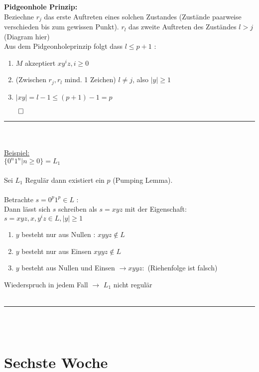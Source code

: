 \documentclass[18pt,a4paper]{scrreprt}
\begin{document}
\textbf{Pidgeonhole Prinzip:}\\
Beziechne $r_j$ das erste Auftreten eines solchen Zustandes (Zustände paarweise verschieden bis zum gewissen Punkt). $r_l$ das zweite Auftreten des Zuständes $l>j$\\
\newpage
(Diagram hier)\\

Aus dem Pidgeonholeprinzip folgt dass $ l \le p+1$ : \\
\begin{enumerate}
\item $ M$ akzeptiert $xy^iz , i \ge 0$\\
\item (Zwischen $r_j,r_l$ mind. 1 Zeichen) $ l \neq j$, also $|y| \ge 1$ \\
\item $|xy| = l-1 \le (p+1)-1=p$\\ 
\end{enumerate}
$\qed$\\
\rule{\textwidth}{0.4mm}\\
\\
\uline{Beispiel:}\\
$ \{0^n1^n | n \ge 0\} = L_1 $\\
\\
Sei $L_1$ Regulär dann existiert ein $p$ (Pumping Lemma). \\
\\
Betrachte $s = 0^p 1^p \in L$ :\\
Dann lässt sich $s$ schreiben als $s = xyz$ mit der Eigenschaft: \
$s = xyz, x,y^iz \in L, |y| \ge 1$ \\
\begin{enumerate}
\item $y$ besteht nur aus Nullen : $xyyz \notin L$\\
\item $y$ besteht nur aus Einsen $xyyz \notin L$ \\
\item $y$ besteht aus Nullen und Einsen $\rightarrow xyyz :$ (Riehenfolge ist falsch)
\end{enumerate}
Wiederspruch in jedem Fall  $ \rightarrow$ $L_1$ nicht regulär
\\
\\
\rule{\textwidth}{0.4mm}\\
\\

\chapter{Sechste Woche}
\end{document}
